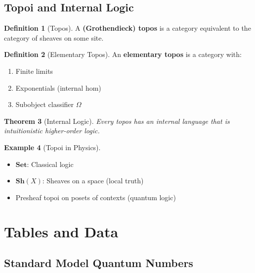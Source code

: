 \documentclass[11pt,a4paper,openright]{book}
\theoremstyle{plain}
\newtheorem{theorem}{Theorem}[chapter]
\theoremstyle{definition}
\newtheorem{definition}[theorem]{Definition}
\newtheorem{example}[theorem]{Example}
\newcommand{\Set}{\mathbf{Set}}
\newcommand{\Sh}{\mathbf{Sh}}
\begin{document}
\section{Topoi and Internal Logic}

\begin{definition}[Topos]
A \textbf{(Grothendieck) topos} is a category equivalent to the category of sheaves on some site.
\end{definition}

\begin{definition}[Elementary Topos]
An \textbf{elementary topos} is a category with:
\begin{enumerate}[label=(\roman*)]
    \item Finite limits
    \item Exponentials (internal hom)
    \item Subobject classifier $\Omega$
\end{enumerate}
\end{definition}

\begin{theorem}[Internal Logic]
Every topos has an internal language that is intuitionistic higher-order logic.
\end{theorem}

\begin{example}[Topoi in Physics]
\begin{itemize}
    \item $\Set$: Classical logic
    \item $\Sh(X)$: Sheaves on a space (local truth)
    \item Presheaf topoi on posets of contexts (quantum logic)
\end{itemize}
\end{example}


\chapter{Tables and Data}
\label{app:tables}

\section{Standard Model Quantum Numbers}
\end{document}
